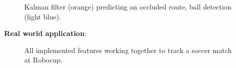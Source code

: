 \documentclass{sciposter}
\begin{document}
\begin{multicols}{3}
\begin{figure}[!h]
	\centering
			\setlength{\fboxsep}{1pt}
			\setlength{\fboxrule}{1pt}
	\caption{Kalman filter (orange) predicting an occluded route, ball detection (light blue).}
	\label{fig:occlusion}
\end{figure}

\textbf{Real world application}:

\begin{figure}[!h]
	\centering
			\setlength{\fboxsep}{1pt}
			\setlength{\fboxrule}{1pt}
	\caption{All implemented features working together to track a soccer match at Robocup.}
	\label{fig:robocup_1}
\end{figure}


\end{multicols}
\end{document}
